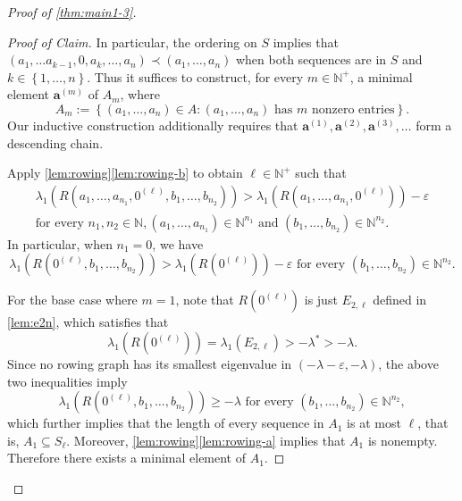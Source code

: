 \documentclass[11pt]{article}
\theoremstyle{definition}
\theoremstyle{remark}
\newenvironment{claimproof}[1][Proof]{\begin{proof}[#1]\renewcommand*{\qedsymbol}{\(\diamondsuit\)}}{\end{proof}}
\newcommand{\dset}[2]{\left\{{#1}\colon{#2}\right\}}
\newcommand{\sset}[1]{\left\{{#1}\right\}}
\newcommand{\eps}{\varepsilon}
\newcommand{\la}{\lambda}
\newcommand{\N}{\mathbb{N}}
\newcommand{\ba}{\bm{a}}
\begin{document}
\begin{proof}[Proof of \cref{thm:main1-3}]
\begin{claimproof}[Proof of Claim]
        In particular, the ordering on $S$ implies that $(a_1, \dots a_{k-1}, 0, a_k, \dots, a_n) \prec (a_1, \dots, a_n)$ when both sequences are in $S$ and $k \in \sset{1, \dots, n}$. Thus it suffices to construct, for every $m \in \N^+$, a minimal element $\ba^{(m)}$ of $A_m$, where
        \[
            A_m := \dset{(a_1, \dots, a_n) \in A}{(a_1, \dots, a_n) \text{ has }m\text{ nonzero entries}}.
        \]
        Our inductive construction additionally requires that $\ba^{(1)}, \ba^{(2)}, \ba^{(3)},\dots$ form a descending chain.
        
        Apply \cref{lem:rowing}\ref{lem:rowing-b} to obtain $\ell \in \N^+$ such that
        \begin{multline} \label{eqn:main1-3-l}
            \la_1(R(a_1, \dots, a_{n_1}, 0^{(\ell)}, b_1, \dots, b_{n_2})) > \la_1(R(a_1, \dots, a_{n_1}, 0^{(\ell)})) - \eps \\
            \text{for every }n_1, n_2 \in \N, (a_1, \dots, a_{n_1}) \in \N^{n_1} \text{ and } (b_1, \dots, b_{n_2}) \in \N^{n_2}.
        \end{multline}
        In particular, when $n_1 = 0$, we have
        \[
            \la_1(R(0^{(\ell)}, b_1, \dots, b_{n_2})) > \la_1(R(0^{(\ell)})) - \eps \text{ for every }(b_1, \dots, b_{n_2}) \in \N^{n_2}.
        \]
        
        For the base case where $m = 1$, note that $R(0^{(\ell)})$ is just $E_{2,\ell}$ defined in \cref{lem:e2n}, which satisfies that
        \[
            \la_1(R(0^{(\ell)})) = \la_1(E_{2,\ell}) > -\la^* > -\la.
        \]
        Since no rowing graph has its smallest eigenvalue in $(-\la - \eps, -\la)$, the above two inequalities imply
        \[
            \la_1(R(0^{(\ell)}, b_1, \dots, b_{n_2})) \ge -\la \text{ for every }(b_1, \dots, b_{n_2}) \in \N^{n_2},
        \]
        which further implies that the length of every sequence in $A_1$ is at most $\ell$, that is, $A_1 \subseteq S_{\ell}$. Moreover, \cref{lem:rowing}\ref{lem:rowing-a} implies that $A_1$ is nonempty. Therefore there exists a minimal element of $A_1$.
    

\end{claimproof}
\end{proof}
\end{document}

